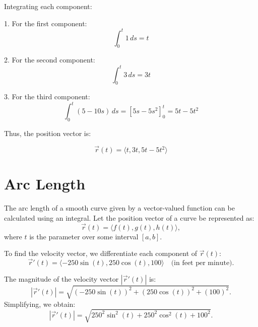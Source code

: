 \documentclass{report}
\begin{document}
Integrating each component:

1. For the first component:
\[
	\int_0^t 1 \, ds = t
\]

2. For the second component:
\[
	\int_0^t 3 \, ds = 3t
\]

3. For the third component:
\[
	\int_0^t (5 - 10s) \, ds = \left[ 5s - 5s^2 \right]_0^t = 5t - 5t^2
\]

Thus, the position vector is:

\[
	\vec{r}(t) = \langle t, 3t, 5t - 5t^2 \rangle
\]

\pagebreak

\section{Arc Length}

The arc length of a smooth curve given by a vector-valued function can be calculated using an integral. Let the position vector of a curve be represented as:
\[
	\vec{r}(t) = \langle f(t), g(t), h(t) \rangle,
\]
where \(t\) is the parameter over some interval \([a, b]\).



\sol

To find the velocity vector, we differentiate each component of \(\vec{r}(t)\):
\[
	\vec{r}'(t) = \langle -250 \sin(t), 250 \cos(t), 100 \rangle \quad \text{(in feet per minute)}.
\]

The magnitude of the velocity vector \(\left| \vec{r}'(t) \right|\) is:
\[
	\left| \vec{r}'(t) \right| = \sqrt{(-250 \sin(t))^2 + (250 \cos(t))^2 + (100)^2}.
\]
Simplifying, we obtain:
\[
	\left| \vec{r}'(t) \right| = \sqrt{250^2 \sin^2(t) + 250^2 \cos^2(t) + 100^2}.
\]
\end{document}
